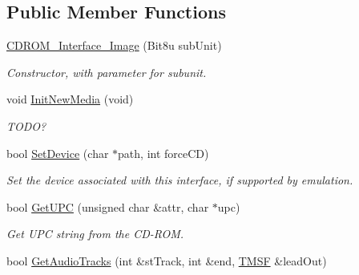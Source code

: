 \subsection*{Public Member Functions}
\begin{DoxyCompactItemize}
\item 
\hypertarget{classCDROM__Interface__Image_acecb6b00f509aba4e203b7bb5c4653fb}{\hyperlink{classCDROM__Interface__Image_acecb6b00f509aba4e203b7bb5c4653fb}{C\-D\-R\-O\-M\-\_\-\-Interface\-\_\-\-Image} (Bit8u sub\-Unit)}\label{classCDROM__Interface__Image_acecb6b00f509aba4e203b7bb5c4653fb}

\begin{DoxyCompactList}\small\item\em Constructor, with parameter for subunit. \end{DoxyCompactList}\item 
\hypertarget{classCDROM__Interface__Image_a8b1323ddfae9e59fae8fa5d8f862c8c4}{void \hyperlink{classCDROM__Interface__Image_a8b1323ddfae9e59fae8fa5d8f862c8c4}{Init\-New\-Media} (void)}\label{classCDROM__Interface__Image_a8b1323ddfae9e59fae8fa5d8f862c8c4}

\begin{DoxyCompactList}\small\item\em T\-O\-D\-O? \end{DoxyCompactList}\item 
\hypertarget{classCDROM__Interface__Image_ae803cb47966de3b637c55c40aaf89e78}{bool \hyperlink{classCDROM__Interface__Image_ae803cb47966de3b637c55c40aaf89e78}{Set\-Device} (char $\ast$path, int force\-C\-D)}\label{classCDROM__Interface__Image_ae803cb47966de3b637c55c40aaf89e78}

\begin{DoxyCompactList}\small\item\em Set the device associated with this interface, if supported by emulation. \end{DoxyCompactList}\item 
\hypertarget{classCDROM__Interface__Image_a0f4704db65cd97e70da4ee7464e535b0}{bool \hyperlink{classCDROM__Interface__Image_a0f4704db65cd97e70da4ee7464e535b0}{Get\-U\-P\-C} (unsigned char \&attr, char $\ast$upc)}\label{classCDROM__Interface__Image_a0f4704db65cd97e70da4ee7464e535b0}

\begin{DoxyCompactList}\small\item\em Get U\-P\-C string from the C\-D-\/\-R\-O\-M. \end{DoxyCompactList}\item 
\hypertarget{classCDROM__Interface__Image_a4aae5ec2ba0011a4f2281bb312aa49c3}{bool \hyperlink{classCDROM__Interface__Image_a4aae5ec2ba0011a4f2281bb312aa49c3}{Get\-Audio\-Tracks} (int \&st\-Track, int \&end, \hyperlink{structSMSF}{T\-M\-S\-F} \&lead\-Out)}\label{classCDROM__Interface__Image_a4aae5ec2ba0011a4f2281bb312aa49c3}


\end{DoxyCompactItemize}
